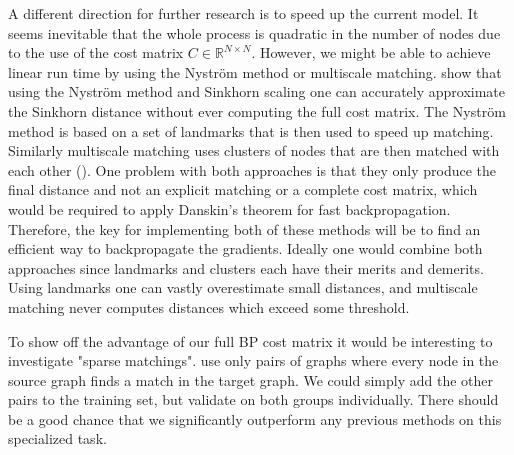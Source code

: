 A different direction for further research is to speed up the current model. It seems inevitable that the whole process is quadratic in the number of nodes due to the use of the cost matrix $C \in \mathbb{R}^{N \times N}$. However, we might be able to achieve linear run time by using the Nystr{\"{o}}m method or multiscale matching. \cite{nytrom2019} show that using the Nystr{\"{o}}m method and Sinkhorn scaling one can accurately approximate the Sinkhorn distance without ever computing the full cost matrix. The Nystr{\"{o}}m method is based on a set of landmarks that is then used to speed up matching. Similarly multiscale matching uses clusters of nodes that are then matched with each other (\citealp{multiscale2016}). One problem with both approaches is that they only produce the final distance and not an explicit matching or a complete cost matrix, which would be required to apply Danskin's theorem for fast backpropagation. Therefore, the key for implementing both of these methods will be to find an efficient way to backpropagate the gradients. Ideally one would combine both approaches since landmarks and clusters each have their merits and demerits. Using landmarks one can vastly overestimate small distances, and multiscale matching never computes distances which exceed some threshold.

To show off the advantage of our full BP cost matrix it would be interesting to investigate "sparse matchings". \cite{fey2020_update} use only pairs of graphs where every node in the source graph finds a match in the target graph. We could simply add the other pairs to the training set, but validate on both groups individually. There should be a good chance that we significantly outperform any previous methods on this specialized task.
